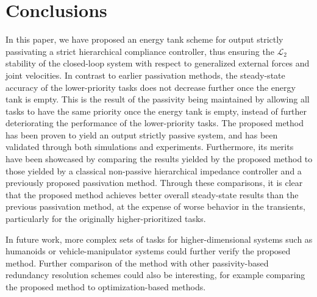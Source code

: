 \documentclass[../main.tex]{subfiles}
\begin{document}
\section{Conclusions}\label{sec:conclusions}
In this paper, we have proposed an energy tank scheme for output strictly passivating a strict hierarchical compliance controller, thus ensuring the $\mathcal{L}_2$ stability of the closed-loop system with respect to generalized external forces and joint velocities.
In contrast to earlier passivation methods, the steady-state accuracy of the lower-priority tasks does not decrease further once the energy tank is empty.
This is the result of the passivity being maintained by allowing all tasks to have the same priority once the energy tank is empty, instead of further deteriorating the performance of the lower-priority tasks.
The proposed method has been proven to yield an output strictly passive system, and has been validated through both simulations and experiments. Furthermore, its merits have been showcased by comparing the results yielded by the proposed method to those yielded by a classical non-passive hierarchical impedance controller and a previously proposed passivation method. 
Through these comparisons, it is clear that the proposed method achieves better overall steady-state results than the previous passivation method, at the expense of worse behavior in the transients, particularly for the originally higher-prioritized tasks.

In future work, more complex sets of tasks for higher-dimensional systems such as humanoids or vehicle-manipulator systems could further verify the proposed method. Further comparison of the method with other passivity-based redundancy resolution schemes could also be interesting, for example comparing the proposed method to optimization-based methods. 


\ifSubfilesClassLoaded{%
  
  
}{}
\end{document}

